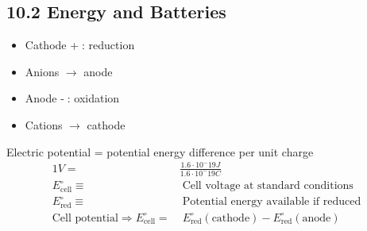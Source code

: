 \subsection{10.2 Energy and Batteries}
    \begin{minipage}{34mm}
        \begin{itemize}
            \itemsep0em
            \item Cathode \textcircled{+}: reduction
            \item Anions $\rightarrow$ anode
        \end{itemize}
    \end{minipage}
    \begin{minipage}{31mm}
        \begin{itemize}
            \itemsep0em
            \item Anode \textcircled{-}: oxidation
            \item Cations $\rightarrow$ cathode
        \end{itemize}
    \end{minipage}
    \vspace*{0.5em}

    Electric potential = potential energy difference per unit charge
    \begin{align*}
        1V =& \frac{1.6 \cdot 10^-19 J}{1.6 \cdot 10^-19 C}\\
        E^\circ_\text{cell} \equiv& \; \text{Cell voltage at standard conditions}\\
        E^\circ_\text{red} \equiv& \; \text{Potential energy available if reduced}\\
        \text{Cell potential} \Rightarrow E^\circ_\text{cell} =& \; E^\circ_\text{red}(\text{cathode}) - E^\circ_\text{red}(\text{anode})
    \end{align*}